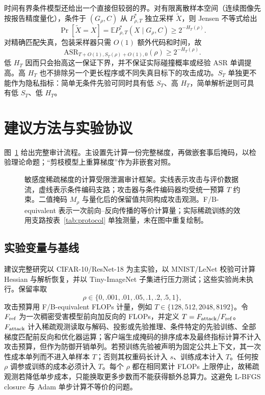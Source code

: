 \documentclass[conference,a4paper]{IEEEtran}
\newcommand{\E}{\mathbb{E}}
\newcommand{\ASR}{\mathrm{ASR}}
\begin{document}
时间有界条件模型还给出一个直接但较弱的界。对有限离散样本空间（连续图像先按报告精度量化），条件于 $(G_\rho,C)$ 从 $P^*_{\rho,T}$ 独立采样 $\widetilde X$，则 Jensen 不等式给出
\begin{equation}
\Pr[\widetilde X=X]
=\E P^*_{\rho,T}(X\mid G_\rho,C)
\geq2^{-H_T(\rho)}.
\label{eq:jensen}
\end{equation}
对精确匹配失真，包装采样器只需 $O(1)$ 额外代码和时间，故
\begin{equation}
\ASR_{T+O(1),S_T(\rho)+O(1),0}(\rho)
\geq2^{-H_T(\rho)}.
\end{equation}
低 $H_T$ 因而只会抬高这一保证下界，并不保证实际碰撞概率或经验 ASR 单调提高。高 $H_T$ 也不排除另一个更长程序或不同失真目标下的攻击成功。$S_T$ 单独更不能作为隐私指标：简单无条件先验可同时具有低 $S_T$、高 $H_T$，简单解析逆则可具有低 $S_T$、低 $H_T$。

\section{建议方法与实验协议}

图~\ref{fig:framework} 给出完整审计流程。主设置先计算一份完整梯度，再做嵌套事后掩码，以检验理论命题；“剪枝模型上重算梯度”作为非嵌套对照。

\begin{figure}[t]
\centering
\resizebox{0.98\textwidth}{!}{}
\caption{敏感度稀疏梯度的计算受限泄漏审计框架。实线表示攻击与评价数据流，虚线表示条件编码支路；攻击器与条件编码器均受统一预算 $T$ 约束。二值掩码 $M_\rho$ 与量化后的保留值共同构成攻击观测。F/B-equivalent 表示一次前向--反向传播的等价计算量；实际稀疏训练的效用支路按表~\ref{tab:protocol} 单独测量，未在图中重复绘制。}
\label{fig:framework}
\end{figure}

\subsection{实验变量与基线}

建议完整研究以 CIFAR-10/ResNet-18 为主实验，以 MNIST/LeNet 校验可计算 Hessian 与解析恢复，并以 Tiny-ImageNet 子集进行压力测试；这些实验尚未执行。保留率取
\begin{equation}
\rho\in\{0,.001,.01,.05,.1,.2,.5,1\},
\end{equation}
攻击预算用 F/B-equivalent FLOPs 计量，例如 $T\in\{128,512,2048,8192\}$。令 $F_{\rm ref}$ 为一次稠密受害模型前向加反向的 FLOPs，并定义 $T=F_{\rm attack}/F_{\rm ref}$。$F_{\rm attack}$ 计入稀疏观测读取与解码、投影或先验推理、条件特定的先验训练、全部梯度匹配前反向和优化器运算；客户端生成掩码的排序成本及最终指标计算不计入攻击预算，但作为防御开销单列。若预训练先验被声明为固定公共上下文，其一次性成本单列而不进入单样本 $T$；否则其权重码长计入 $s$、训练成本计入 $T$。任何按 $\rho$ 调参或训练的成本必须计入 $T$。每个 $\rho$ 都在相同累计 FLOPs 上限停止，故稀疏观测若降低单步成本，只能换取更多步数而不能获得额外总算力。这避免 L-BFGS closure 与 Adam 单步计算不等价的问题。
\end{document}
